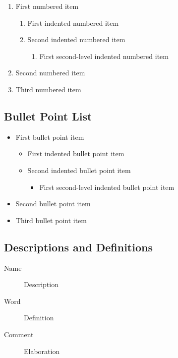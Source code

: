 \documentclass[
	11pt, %
	fleqn, %
	a4paper, %
]{LegrandOrangeBook}
\begin{document}
\begin{enumerate}
	\item First numbered item
	      \begin{enumerate}
		      \item First indented numbered item
		      \item Second indented numbered item
		            \begin{enumerate}
			            \item First second-level indented numbered item
		            \end{enumerate}
	      \end{enumerate}
	\item Second numbered item
	\item Third numbered item
\end{enumerate}

\subsection{Bullet Point List}

\begin{itemize}
	\item First bullet point item
	      \begin{itemize}
		      \item First indented bullet point item
		      \item Second indented bullet point item
		            \begin{itemize}
			            \item First second-level indented bullet point item
		            \end{itemize}
	      \end{itemize}
	\item Second bullet point item
	\item Third bullet point item
\end{itemize}

\subsection{Descriptions and Definitions}

\begin{description}
	\item[Name] Description
	\item[Word] Definition
	\item[Comment] Elaboration
\end{description}
\end{document}
